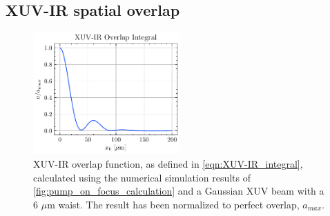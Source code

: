 \subsection{XUV-IR spatial overlap}

\begin{figure}
	\centering
	\includegraphics[width=0.5\textwidth]{figures/chap4/XUV-IR_overlap_integral.pdf}
	\caption{XUV-IR overlap function, as defined in \cref{eqn:XUV-IR_integral}, calculated using the numerical simulation results of \cref{fig:pump_on_focus_calculation} and a Gaussian XUV beam with a 6 $\mu$m waist. The result has been normalized to perfect overlap, $a_{max}$.}
	\label{fig:XUV-IR_integral}
\end{figure}

